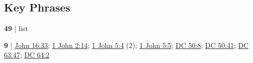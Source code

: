 	
		
		
	
		
		
\subsection{Key Phrases} %
	\label{WORLD-PHRASES}

	\begin{compactdesc}
	
		\item[foundation of the world] \textbf{49} | list
			
		\item[overcome the world] \textbf{9} | \hyperref[JOHN-16-33]{John 16:33}; \hyperref[1JOHN-2-14]{1 John 2:14}; \hyperref[1JOHN-5-4]{1 John 5:4} (2); \hyperref[1JOHN-5-5]{1 John 5:5}; \hyperref[DC50-8]{DC 50:8}; \hyperref[DC50-41]{DC 50:41}; \hyperref[DC63-47]{DC 63:47}; \hyperref[DC64-2]{DC 64:2}
			
	\end{compactdesc}
	
